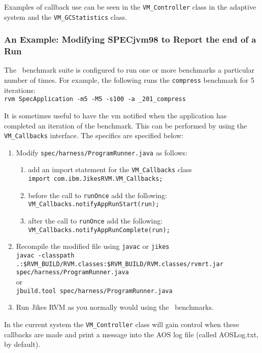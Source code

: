 Examples of callback use can be seen in the {\tt VM\_Controller} class in the
adaptive system and the {\tt VM\_GCStatistics} class.

\subsubsection{An Example: Modifying SPECjvm98 to Report the end of a
Run}\label{sssec:callback-example}
The \spec\ benchmark suite is configured to run one or more benchmarks
a particular number of times.  For example, the following runs the
{\tt compress} benchmark for 5 iterations:\\
{\tt rvm SpecApplication -m5 -M5 -s100 -a \_201\_compress}

It is sometimes useful to have the vm notified when the application
has completed an iteration of the benchmark.   This can be performed
by using the {\tt VM\_Callbacks} interface.  The specifics are
specified below:
\begin{enumerate}
\item Modify {\tt spec/harness/ProgramRunner.java} as follows:
	\begin{enumerate}
	\item add an import statement for the {\tt VM\_Callbacks} class \\
    {\tt import com.ibm.JikesRVM.VM\_Callbacks;}
	\item before the call to {\tt runOnce} add the following: \\
    {\tt VM\_Callbacks.notifyAppRunStart(run);}
	\item after the call to {\tt runOnce} add the following: \\	
    {\tt VM\_Callbacks.notifyAppRunComplete(run);}
	\end{enumerate}

\item Recompile the modified file using {\tt javac} or {\tt jikes} \\
   {\tt javac -classpath 
   .:\$RVM\_BUILD/RVM.classes:\$RVM\_BUILD/RVM.classes/rvmrt.jar
   spec/harness/ProgramRunner.java} \\
or \\
   {\tt jbuild.tool spec/harness/ProgramRunner.java} \\

\item Run Jikes RVM as you normally would using the \spec\ benchmarks.
\end{enumerate}

In the current system the {\tt VM\_Controller} class will gain control
when these callbacks are made and print a message into the AOS log
file (called AOSLog.txt, by default).

\JikesTMFooter
